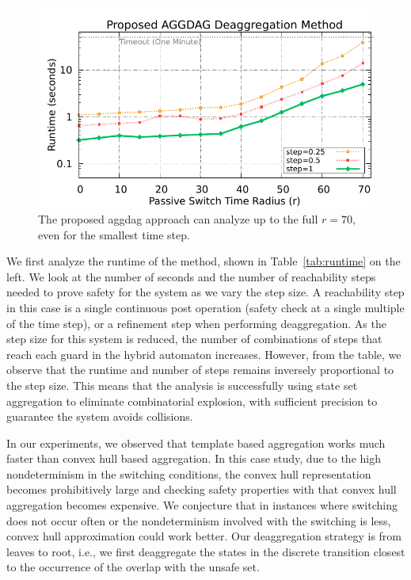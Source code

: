 \begin{figure}[t]
\centerline{\includegraphics[width=0.9\columnwidth]{images/deagg.pdf}}
\caption{The proposed aggdag approach can analyze up to the full $r=70$, even for the smallest time step.}
\label{fig:deagg}
\end{figure}


We first analyze the runtime of the method, shown in Table~\ref{tab:runtime} on the left.
%
We look at the number of seconds and the number of reachability steps needed to prove safety for the system as we vary the step size.
%
A reachability step in this case is a single continuous post operation (safety check at a single multiple of the time step), or a refinement step when performing deaggregation.
%
As the step size for this system is reduced, the number of combinations of steps that reach each guard in the hybrid automaton increases.
%
However, from the table, we observe that the runtime and number of steps remains inversely proportional to the step size.
%
This means that the analysis is successfully using state set aggregation to eliminate combinatorial explosion, with sufficient
precision to guarantee the system avoids collisions. 

In our experiments, we observed that template based aggregation works much faster than convex hull based aggregation. In this case study, due to the high nondeterminism in the switching conditions, the convex hull representation becomes prohibitively large and checking safety properties with that convex hull aggregation becomes expensive. We conjecture that in instances where switching does not occur often or the nondeterminism involved with the switching is less, convex hull approximation could work better.
Our deaggregation strategy is from leaves to root, i.e., we first deaggregate the states in the discrete transition closest to the occurrence of the overlap with the unsafe set.


